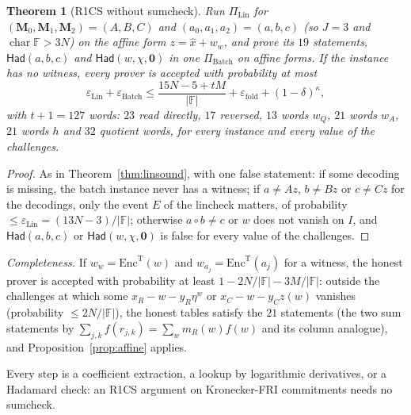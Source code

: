 \documentclass[11pt]{article}
\newtheorem{theorem}{Theorem}
\theoremstyle{definition}
\newcommand{\F}{\mathbb{F}}
\begin{document}
\begin{theorem}[R1CS without sumcheck]\label{thm:r1cs}
Run $\Pi_{\mathrm{Lin}}$ for $(\mathbf M_0,\mathbf M_1,\mathbf M_2)=(A,B,C)$ and $(a_0,a_1,a_2)=(a,b,c)$ (so $J=3$ and $\operatorname{char}\F>3N$) on the affine form $z=\hat x+w_w$, and prove its $19$ statements, $\mathsf{Had}(a,b,c)$ and $\mathsf{Had}(w,\chi,\mathbf 0)$ in one $\Pi_{\mathrm{Batch}}$ on affine forms. If the instance has no witness, every prover is accepted with probability at most
\[
\varepsilon_{\mathrm{Lin}}+\varepsilon_{\mathrm{Batch}}\le\frac{15N-5+tM}{|\F|}+\varepsilon_{\mathrm{fold}}+(1-\delta)^\kappa ,
\]
with $t+1=127$ words: $23$ read directly, $17$ reversed, $13$ words $w_Q$, $21$ words $w_A$, $21$ words $h$ and $32$ quotient words, for every instance and every value of the challenges.
\end{theorem}
\begin{proof}
As in Theorem~\ref{thm:linsound}, with one false statement: if some decoding is missing, the batch instance never has a witness; if $a\ne Az$, $b\ne Bz$ or $c\ne Cz$ for the decodings, only the event $E$ of the lincheck matters, of probability $\le\varepsilon_{\mathrm{Lin}}=(13N-3)/|\F|$; otherwise $a\circ b\ne c$ or $w$ does not vanish on $I$, and $\mathsf{Had}(a,b,c)$ or $\mathsf{Had}(w,\chi,\mathbf 0)$ is false for every value of the challenges.
\end{proof}

\emph{Completeness.} If $w_w=\mathrm{Enc}^{\mathrm T}(w)$ and $w_{a_j}=\mathrm{Enc}^{\mathrm T}(a_j)$ for a witness, the honest prover is accepted with probability at least $1-2N/|\F|-3M/|\F|$: outside the challenges at which some $x_R-w-y_R\eta^w$ or $x_C-w-y_Cz(w)$ vanishes (probability $\le2N/|\F|$), the honest tables satisfy the $21$ statements (the two sum statements by $\sum_{j,k}f(r_{j,k})=\sum_wm_R(w)f(w)$ and its column analogue), and Proposition~\ref{prop:affine} applies.

Every step is a coefficient extraction, a lookup by logarithmic derivatives, or a Hadamard check: an R1CS argument on Kronecker-FRI commitments needs no sumcheck.
\end{document}
